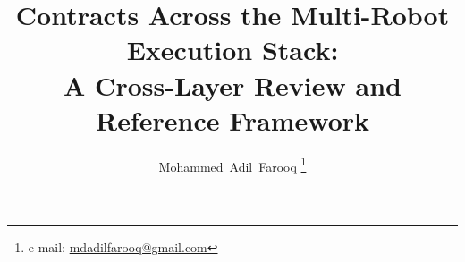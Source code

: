 \documentclass[journal]{IEEEtran}
\begin{document}
\title{Contracts Across the Multi-Robot Execution Stack:\\
  A Cross-Layer Review and Reference Framework}

\author{Mohammed~Adil~Farooq%
\thanks{e-mail: \href{mailto:mdadilfarooq@gmail.com}{mdadilfarooq@gmail.com}}}

\maketitle













\end{document}
